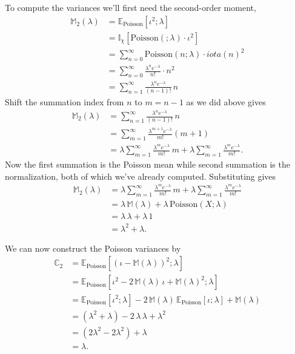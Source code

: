 \documentclass[
  letterpaper,
  DIV=11,
  numbers=noendperiod]{scrartcl}
\begin{document}
To compute the variances we'll first need the second-order moment,
\begin{align*}
\mathbb{M}_{2}(\lambda)
&= \mathbb{E}_{\mathrm{Poisson}} [ \iota^{2} ; \lambda ]
\\
&= \mathbb{I}_{\chi} [ \mathrm{Poisson}( ; \lambda) \cdot \iota^{2} ]
\\
&= \sum_{n = 0}^{\infty} \mathrm{Poisson}(n; \lambda) \cdot iota(n)^{2}
\\
&= \sum_{n = 0}^{\infty} \frac{ \lambda^{n} e^{-\lambda} }{ n! } \cdot n^{2}
\\
&= \sum_{n = 1}^{\infty} \frac{ \lambda^{n} e^{-\lambda} }{ (n - 1)! } \, n
\end{align*} Shift the summation index from \(n\) to \(m = n - 1\) as we
did above gives \begin{align*}
\mathbb{M}_{2}(\lambda)
&= \sum_{n = 1}^{\infty} \frac{ \lambda^{n} e^{-\lambda} }{ (n - 1)! } \, n
\\
&= \sum_{m = 1}^{\infty} \frac{ \lambda^{m + 1} e^{-\lambda} }{ m! } (m + 1)
\\
&= \lambda \sum_{m = 1}^{\infty} \frac{ \lambda^{m} e^{-\lambda} }{ m! } \, m
+ \lambda \sum_{m = 1}^{\infty} \frac{ \lambda^{m} e^{-\lambda} }{ m! }.
\end{align*} Now the first summation is the Poisson mean while second
summation is the normalization, both of which we've already computed.
Substituting gives \begin{align*}
\mathbb{M}_{2}(\lambda)
&=  \lambda \sum_{m = 1}^{\infty} \frac{ \lambda^{m} e^{-\lambda} }{ m! } \, m
  + \lambda \sum_{m = 1}^{\infty} \frac{ \lambda^{m} e^{-\lambda} }{ m! }
\\
&=  \lambda \, \mathbb{M}(\lambda)
  + \lambda \, \mathrm{Poisson}(X; \lambda)
\\
&=  \lambda \, \lambda
  + \lambda \, 1
\\
&=  \lambda^{2} + \lambda.
\end{align*}

We can now construct the Poisson variances by \begin{align*}
\mathbb{C}_{2}
&=
\mathbb{E}_{\mathrm{Poisson}} [ (\iota - \mathbb{M}(\lambda))^{2} ; \lambda ]
\\
&=
\mathbb{E}_{\mathrm{Poisson}}
[ \iota^{2} - 2 \, \mathbb{M}(\lambda) \, \iota + \mathbb{M}(\lambda)^{2} ; \lambda ]
\\
&=
\mathbb{E}_{\mathrm{Poisson}} [ \iota^{2} ; \lambda ]
-2 \, \mathbb{M}(\lambda) \, \mathbb{E}_{\mathrm{Poisson}} [ \iota ; \lambda ]
+ \mathbb{M}(\lambda)
\\
&=
\left( \lambda^{2} + \lambda \right)
-2 \, \lambda \, \lambda
+ \lambda^{2}
\\
&= (2 \lambda^{2} - 2 \lambda^{2}) + \lambda
\\
&=
\lambda.
\end{align*}
\end{document}
